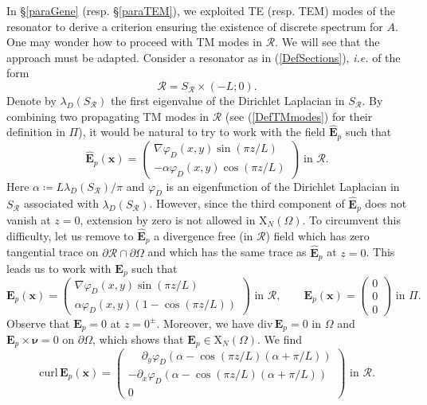 \documentclass[11pt,a4paper]{article}
\newcommand{\Om}{\Omega}
\newcommand{\mrm}[1]{\mathrm{#1}}
\newcommand{\bfx}{\boldsymbol{x}}
\newcommand{\bfnu}{\boldsymbol{\nu}}
\newcommand{\mX}{\mrm{X}}
\newcommand{\curlvec}{\boldsymbol{\mrm{curl}}\,}
\renewcommand{\div}{\mrm{div}}
\def\E{\boldsymbol{E}}
\begin{document}
In \S\ref{paraGene} (resp. \S\ref{paraTEM}), we exploited TE (resp. TEM) modes of the resonator to derive a criterion ensuring the existence of discrete spectrum for $A$. One may wonder how to proceed with TM modes in $\mathcal{R}$. We will see that the approach must be adapted. Consider a resonator as in (\ref{DefSections}), \textit{i.e.} of the form 
\[
\mathcal{R}=S_{\mathcal{R}}\times(-L;0).
\]
Denote by $\lambda_D(S_{\mathcal{R}})$ the first eigenvalue of the Dirichlet Laplacian in $S_{\mathcal{R}}$. By combining two propagating TM modes in $\mathcal{R}$ (see (\ref{DefTMmodes}) for their definition in $\Pi$), it would be natural to try to work with the field $\hat{\E}_p$ such that 
\[ 
\hat{\E}_p(\bfx)=\left(\begin{array}{c}\nabla \varphi_D(x,y)\sin(\pi z/L)\\[2pt]-\alpha \varphi_D(x,y)\cos(\pi z/L)\end{array}\right)\mbox{ in }\mathcal{R}.
\]
Here $\alpha\coloneqq L\lambda_D(S_{\mathcal{R}})/\pi$ and $\varphi_D$ is an eigenfunction of the Dirichlet Laplacian in $S_{\mathcal{R}}$ associated with $\lambda_D(S_{\mathcal{R}})$. However, since the third component of $\hat{\E}_p$ does not vanish at $z=0$, extension by zero is not allowed in $\boldsymbol{\mX}_N(\Om)$. To circumvent this difficulty, let us remove to $\hat{\E}_p$ a divergence free (in $\mathcal{R}$) field which has zero tangential trace on $\partial\mathcal{R}\cap\partial\Om$ and which has the same trace as $\hat{\E}_p$ at $z=0$. This leads us to work with $\E_{p}$ such that
\begin{equation}\label{DefEpTM}
\E_{p}(\bfx)= \left(\begin{array}{c}
\nabla \varphi_D(x,y)\sin(\pi z/L)\\[2pt]
\alpha\varphi_D(x,y)(1-\cos(\pi z/L))
\end{array}\right)
\mbox{ in }\mathcal{R},\qquad \E_{p}(\bfx)=\left(\begin{array}{c}
0\\
0\\
0
\end{array}\right)\mbox{ in }\Pi.
\end{equation}
Observe that $\E_{p}=0$ at $z=0^\pm$. Moreover, we have $\div\,\E_{p}=0$ in $\Om$ and $\E_{p}\times\bfnu=0$ on $\partial\Om$, which shows that $\E_{p}\in\boldsymbol{\mX}_N(\Om)$. We find
\[
\curlvec\E_{p}(\bfx)= \left(\begin{array}{c}
\phantom{-}\partial_y\varphi_D(\alpha-\cos(\pi z/L)(\alpha+\pi/L))\\[2pt]
-\partial_x\varphi_D(\alpha-\cos(\pi z/L)(\alpha+\pi/L))\\[2pt]
0
\end{array}\right)\mbox{ in }\mathcal{R}.
\]
\end{document}
